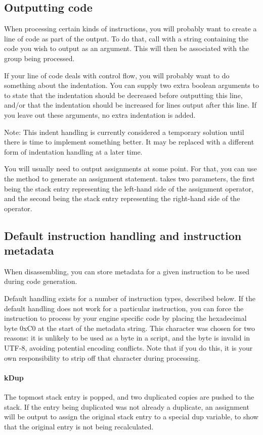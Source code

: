 \subsection{Outputting code}
When processing certain kinds of instructions, you will probably want to create a line of code as part of the output. To do that, call  with a string containing the code you wish to output as an argument. This will then be associated with the group being processed.

If your line of code deals with control flow, you will probably want to do something about the indentation. You can supply two extra boolean arguments to  to state that the indentation should be decreased before outputting this line, and/or that the indentation should be increased for lines output after this line. If you leave out these arguments, no extra indentation is added.

Note: This indent handling is currently considered a temporary solution until there is time to implement something better. It may be replaced with a different form of indentation handling at a later time.

You will usually need to output assignments at some point. For that, you can use the  method to generate an assignment statement.  takes two parameters, the first being the stack entry representing the left-hand side of the assignment operator, and the second being the stack entry representing the right-hand side of the operator.

\subsection{Default instruction handling and instruction metadata}
When disassembling, you can store metadata for a given instruction to be used during code generation.

Default handling exists for a number of instruction types, described below. If the default handling does not work for a particular instruction, you can force the instruction to process by your engine specific code by placing the hexadecimal byte 0xC0 at the start of the metadata string. This character was chosen for two reasons: it is unlikely to be used as a byte in a script, and the byte is invalid in UTF-8, avoiding potential encoding conflicts. Note that if you do this, it is your own responsibility to strip off that character during processing.

\paragraph{kDup}
The topmost stack entry is popped, and two duplicated copies are pushed to the stack. If the entry being duplicated was not already a duplicate, an assignment will be output to assign the original stack entry to a special dup variable, to show that the original entry is not being recalculated.

